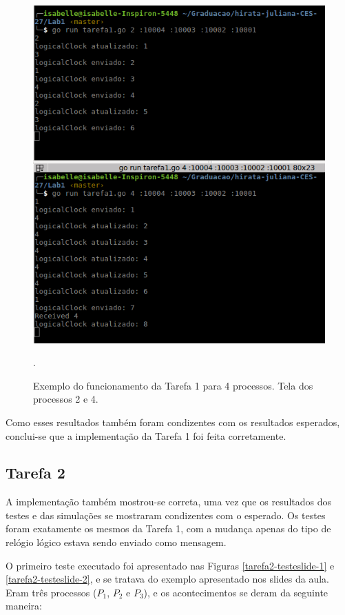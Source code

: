 \documentclass[conference]{IEEEtran}
\begin{document}
\begin{figure}[H]
\centering
\centerline{\includegraphics[scale=0.4]{imagens/tarefa1-testecriado-2.png}}
\caption{Exemplo do funcionamento da Tarefa 1 para 4 processos. Tela dos processos 2 e 4.}.
\label{tarefa1-testecriado-2}
\end{figure}

	Como esses resultados também foram condizentes com os resultados esperados, conclui-se que a implementação da Tarefa 1 foi feita corretamente.

\subsection{Tarefa 2}

	A implementação também mostrou-se correta, uma vez que os resultados dos testes e das simulações se mostraram condizentes com o esperado. Os testes foram exatamente os mesmos da Tarefa 1, com a mudança apenas do tipo de relógio lógico estava sendo enviado como mensagem.
	
	O primeiro teste executado foi apresentado nas Figuras \ref{tarefa2-testeslide-1} e \ref{tarefa2-testeslide-2}, e se tratava do exemplo apresentado nos slides da aula. Eram três processos ($P_1$, $P_2$ e $P_3$), e os acontecimentos se deram da seguinte maneira:
	
\end{document}
